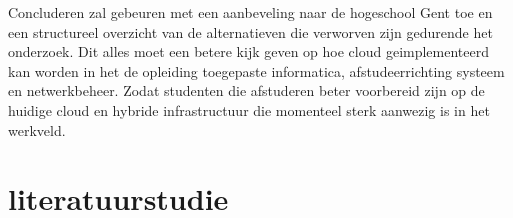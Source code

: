 Concluderen zal gebeuren met een aanbeveling naar de hogeschool Gent toe en een structureel overzicht van de alternatieven die verworven zijn gedurende het onderzoek. Dit alles moet een betere kijk geven op hoe cloud geimplementeerd kan worden in het de opleiding toegepaste informatica, afstudeerrichting systeem en netwerkbeheer. Zodat studenten die afstuderen beter voorbereid zijn op de huidige cloud en hybride infrastructuur die momenteel sterk aanwezig is in het werkveld. 








\section{literatuurstudie}%
\label{sec:literatuurstudie}

